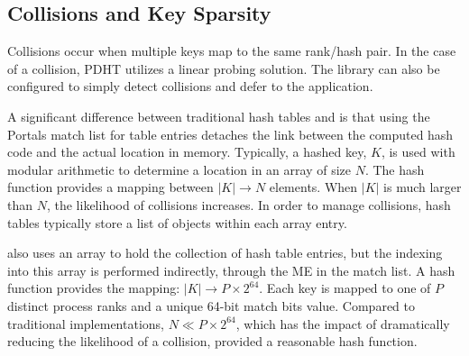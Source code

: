 \vspace{-1mm}

\subsection{Collisions and Key Sparsity}

Collisions occur when multiple keys map to the same rank/hash pair.
In the case of a collision, PDHT utilizes a linear probing
solution. The library can also be configured to simply detect
collisions and defer to the application.


A significant difference between traditional hash tables and \pdht is
that using the Portals match list for table entries detaches the link
between the computed hash code and the actual location in
memory. Typically, a hashed key, $K$,  is used with modular arithmetic to
determine a location in an array of size $N$. The hash function
provides a mapping between $|K| \rightarrow N$ elements. When $|K|$ is
much larger than $N$, the likelihood of collisions increases. In order
to manage collisions, hash tables typically store a list of objects within
each array entry.
% 
%
%

\pdht also uses an array to hold the collection of hash table
entries, but the indexing into this array is performed indirectly,
through the ME in the match list. A \pdht hash function provides the 
mapping: $|K| \rightarrow P \times 2^{64}$. Each key is mapped to one
of $P$ distinct process ranks and a unique 64-bit match bits
value. Compared to traditional implementations, $N \ll  P \times
2^{64}$, which has the impact of dramatically reducing the likelihood
of a collision, provided a reasonable hash function.


